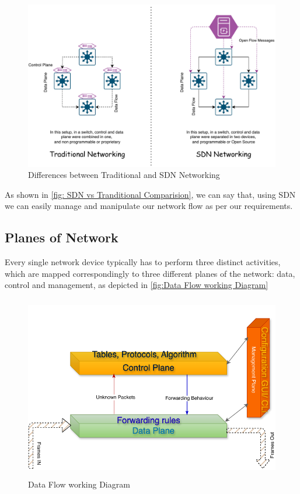 \documentclass[12pt,letterpaper]{article}
\begin{document}
    \begin{figure}[ht]
        \centering
        \includegraphics[height = 12 cm]{images/sndvtra.pdf}
        \caption{Differences between Traditional and SDN Networking}
        \label{fig: SDN vs Tranditional Comparision}
    \end{figure}

    As shown in \autoref{fig: SDN vs Tranditional Comparision}, we can say that, using SDN we can easily manage and manipulate our network flow as per our requirements.

    \subsection{Planes of Network}

    Every single network device typically has to perform three distinct activities, which are mapped correspondingly to three different planes of the network: data, control and management, as depicted in \autoref{fig:Data Flow working Diagram}

    \begin{figure}
        \centering
        \includegraphics[height= 8cm]{images/Data Flow Diagram.drawio.pdf}
        \caption{Data Flow working Diagram}
        \label{fig:Data Flow working Diagram}
    \end{figure}
\end{document}
